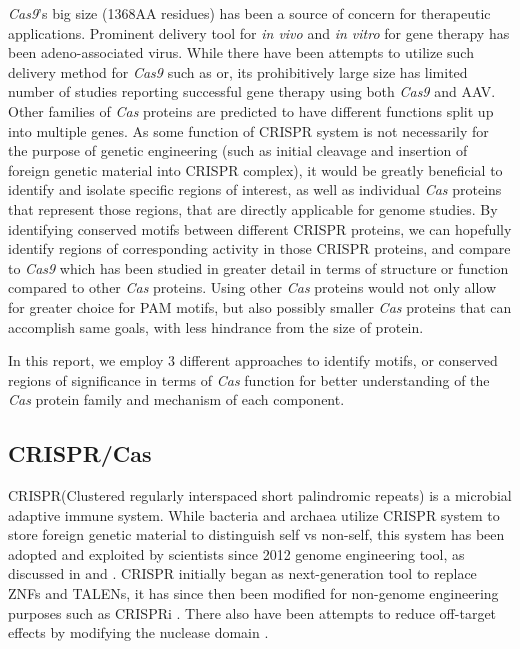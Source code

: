 \documentclass[11pt, oneside]{article}
\begin{document}
\textit{Cas9}'s big size (1368AA residues) has been a source of concern for therapeutic applications.  Prominent delivery tool for \textit{in vivo} and \textit{in vitro} for gene therapy has been adeno-associated virus. While there have been attempts to utilize such delivery method for \textit{Cas9} such as \cite{aav1} or\cite{aav2}, its prohibitively large size has limited number of studies reporting successful gene therapy using both \textit{Cas9} and AAV. Other families of \textit{Cas} proteins are predicted to have different functions split up into multiple genes. As some function of CRISPR system is not necessarily for the purpose of genetic engineering (such as initial cleavage and insertion of foreign genetic material into CRISPR complex), it would be greatly beneficial to identify and isolate specific regions of interest, as well as individual \textit{Cas} proteins that represent those regions, that are directly applicable for genome studies. By identifying conserved motifs between different CRISPR proteins, we can hopefully identify regions of corresponding activity in those CRISPR proteins, and compare to \textit{Cas9} which has been studied in greater detail in terms of structure\cite{cas9structure} or function\cite{mali} compared to other \textit{Cas} proteins. Using other \textit{Cas} proteins would not only allow for greater choice for PAM motifs, but also possibly smaller \textit{Cas} proteins that can accomplish same goals, with less hindrance from the size of protein.

In this report, we employ 3 different approaches to identify motifs, or conserved regions of significance in terms of \textit{Cas} function for better understanding of the \textit{Cas} protein family and mechanism of each component. 

\subsection{CRISPR/Cas} \label{crisprintro}

CRISPR(Clustered regularly interspaced short palindromic repeats) is a microbial adaptive immune system. While bacteria and archaea utilize CRISPR system to store foreign genetic material to distinguish self vs non-self, this system has been adopted and exploited by scientists since 2012 genome engineering tool, as discussed in \cite{jenniferdoudna} and \cite{fengzhang}. CRISPR initially began as next-generation tool to replace ZNFs and TALENs, it has since then been modified for non-genome engineering purposes such as CRISPRi \cite{stanleyqi}. There also have been attempts to reduce off-target effects by modifying the nuclease domain\cite{doublenick} . 
\end{document}
